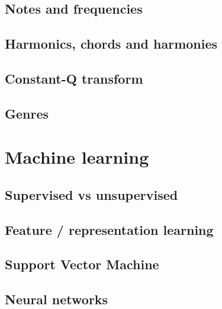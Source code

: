 \documentclass[a4paper,12pt,twoside]{report}
\begin{document}
\section{Notes and frequencies}

\section{Harmonics, chords and harmonies}

\section{Constant-Q transform}

\section{Genres}

\chapter{Machine learning}

\section{Supervised vs unsupervised}

\section{Feature / representation learning}

\section{Support Vector Machine}

\section{Neural networks}
\end{document}
